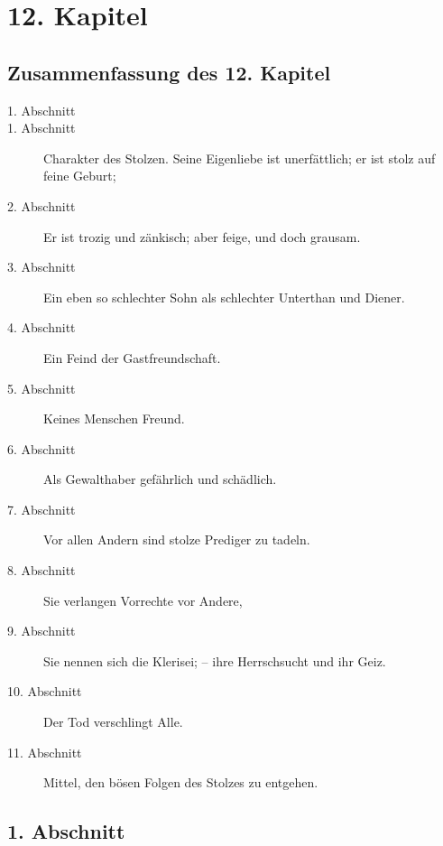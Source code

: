 
\chapter{12. Kapitel}

\section{Zusammenfassung des 12. Kapitel}
\small
\begin{description}
\item[1. Abschnitt]
\item[1. Abschnitt] Charakter des Stolzen. Seine Eigenliebe ist unerfättlich; er ist stolz auf feine Geburt;
\item[2. Abschnitt] Er ist trozig und zänkisch; aber feige, und doch grausam.
\item[3. Abschnitt] Ein eben so schlechter Sohn als schlechter Unterthan und Diener.
\item[4. Abschnitt] Ein Feind der Gastfreundschaft.
\item[5. Abschnitt] Keines Menschen Freund.
\item[6. Abschnitt] Als Gewalthaber gefährlich und schädlich.
\item[7. Abschnitt] Vor allen Andern sind stolze Prediger zu tadeln.
\item[8. Abschnitt] Sie verlangen Vorrechte vor Andere,
\item[9. Abschnitt] Sie nennen sich die Klerisei; -- ihre Herrschsucht und ihr Geiz.
\item[10. Abschnitt] Der Tod verschlingt Alle.
\item[11. Abschnitt] Mittel, den bösen Folgen des Stolzes zu entgehen.
\end{description}
\normalsize

\section{1. Abschnitt}

